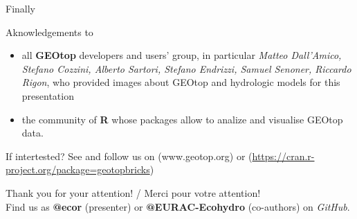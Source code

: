 \documentclass[ignorenonframetext,]{beamer}
\providecommand{\tightlist}{%
  \setlength{\itemsep}{0pt}\setlength{\parskip}{0pt}}
\begin{document}
\begin{frame}{Finally}

Aknowledgements to

\begin{itemize}
\tightlist
\item
  all \textbf{GEOtop} developers and users' group, in particular
  \emph{Matteo Dall'Amico, Stefano Cozzini, Alberto Sartori, Stefano
  Endrizzi, Samuel Senoner, Riccardo Rigon}, who provided images about
  GEOtop and hydrologic models for this presentation
\item
  the community of \textbf{R} whose packages allow to analize and
  visualise GEOtop data.
\end{itemize}

If intertested? See and follow us on (www.geotop.org) or
(\url{https://cran.r-project.org/package=geotopbricks})

Thank you for your attention! / Merci pour votre attention!\\
Find us as \textbf{@ecor} (presenter) or \textbf{@EURAC-Ecohydro}
(co-authors) on \emph{GitHub}.

\end{frame}
\end{document}
